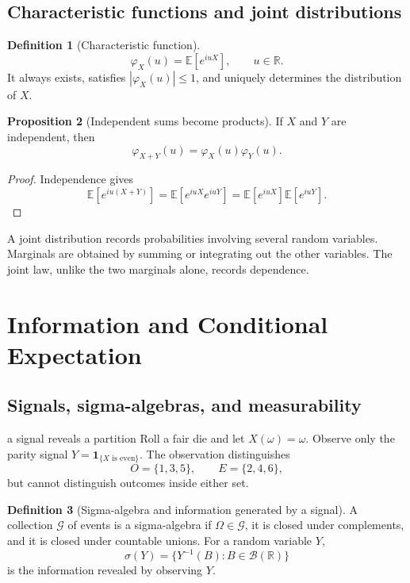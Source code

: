 \documentclass[10pt]{article}
\newcommand{\E}{\mathbb E}
\newcommand{\R}{\mathbb R}
\newcommand{\1}{\mathbf 1}
\newcommand{\cG}{\mathcal G}
\theoremstyle{definition}
\newtheorem{definition}{Definition}[section]
\newtheorem{proposition}[definition]{Proposition}
\begin{document}
\subsection{Characteristic functions and joint distributions}

\begin{definition}[Characteristic function]
\[
\varphi_X(u)=\E[e^{iuX}],\qquad u\in\R.
\]
It always exists, satisfies $|\varphi_X(u)|\le1$, and uniquely determines the
distribution of $X$.
\end{definition}

\begin{proposition}[Independent sums become products]
If $X$ and $Y$ are independent, then
\[
\varphi_{X+Y}(u)=\varphi_X(u)\varphi_Y(u).
\]
\end{proposition}
\begin{proof}
Independence gives
\[
\E[e^{iu(X+Y)}]=\E[e^{iuX}e^{iuY}]
=\E[e^{iuX}]\E[e^{iuY}].
\]
\end{proof}

A joint distribution records probabilities involving several random variables.
Marginals are obtained by summing or integrating out the other variables. The
joint law, unlike the two marginals alone, records dependence.

\section{Information and Conditional Expectation}

\subsection{Signals, sigma-algebras, and measurability}

\begin{boardexample}{a signal reveals a partition}
Roll a fair die and let $X(\omega)=\omega$. Observe only the parity signal
$Y=\1_{\{X\text{ is even}\}}$. The observation distinguishes
\[
O=\{1,3,5\},
\qquad
E=\{2,4,6\},
\]
but cannot distinguish outcomes inside either set.
\end{boardexample}

\begin{definition}[Sigma-algebra and information generated by a signal]
A collection $\cG$ of events is a sigma-algebra if
$\Omega\in\cG$, it is closed under complements, and it is closed under
countable unions. For a random variable $Y$,
\[
\sigma(Y)=\{Y^{-1}(B):B\in\mathcal B(\R)\}
\]
is the information revealed by observing $Y$.
\end{definition}
\end{document}

